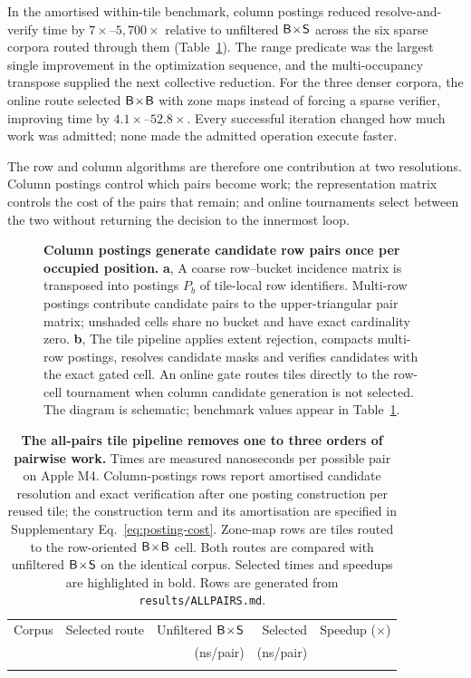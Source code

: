 In the amortised within-tile benchmark, column postings reduced resolve-and-verify time by
$7\times$--$5{,}700\times$ relative to unfiltered $\textsf{B}\!\times\!\textsf{S}$ across the six sparse corpora
routed through them (Table~\ref{tab:allpairs}). The range predicate was the largest single
improvement in the optimization sequence, and the multi-occupancy transpose supplied the next
collective reduction. For the three denser corpora, the online route selected
$\textsf{B}\!\times\!\textsf{B}$ with zone maps instead of forcing a sparse verifier, improving time by
$4.1\times$--$52.8\times$. Every successful iteration changed how much work was admitted; none
made the admitted operation execute faster.

The row and column algorithms are therefore one contribution at two resolutions. Column postings
control which pairs become work; the representation matrix controls the cost of the pairs that
remain; and online tournaments select between the two without returning the decision to the
innermost loop.

\clearpage

\begin{figure}[!t]
\centering

\caption{\textbf{Column postings generate candidate row pairs once per occupied position.}
\textbf{a}, A coarse row--bucket incidence matrix is transposed into postings $P_b$ of tile-local row
identifiers. Multi-row postings contribute candidate pairs to the upper-triangular pair matrix;
unshaded cells share no bucket and have exact cardinality zero. \textbf{b}, The tile pipeline applies
extent rejection, compacts multi-row postings, resolves candidate masks and verifies candidates with
the exact gated \cell{\rB}{\rS} cell. An online gate routes tiles directly to the row-cell tournament when
column candidate generation is not selected. The diagram is schematic; benchmark values appear in
Table~\ref{tab:allpairs}.}
\label{fig:batch}
\end{figure}

\begin{table}[!t]
\centering
\footnotesize
\setlength{\tabcolsep}{5pt}
\renewcommand\arraystretch{1.05}
\caption{\textbf{The all-pairs tile pipeline removes one to three orders of pairwise work.}
Times are measured nanoseconds per possible pair on Apple M4. Column-postings rows report amortised
candidate resolution and exact verification after one posting construction per reused tile; the
construction term and its amortisation are specified in Supplementary Eq.~\eqref{eq:posting-cost}.
Zone-map rows are tiles routed to the row-oriented
$\textsf{B}\!\times\!\textsf{B}$ cell. Both routes are compared with unfiltered $\textsf{B}\!\times\!\textsf{S}$ on the identical
corpus. Selected times and speedups are highlighted in bold. Rows are generated from
\texttt{results/ALLPAIRS.md}.}
\label{tab:allpairs}
\begin{tabular}{@{}l l r r r@{}}
\toprule
Corpus & Selected route & Unfiltered $\textsf{B}\!\times\!\textsf{S}$ & Selected & Speedup ($\times$) \\
& & (ns/pair) & (ns/pair) & \\
\midrule
\tabularnewline
\bottomrule
\end{tabular}
\end{table}

